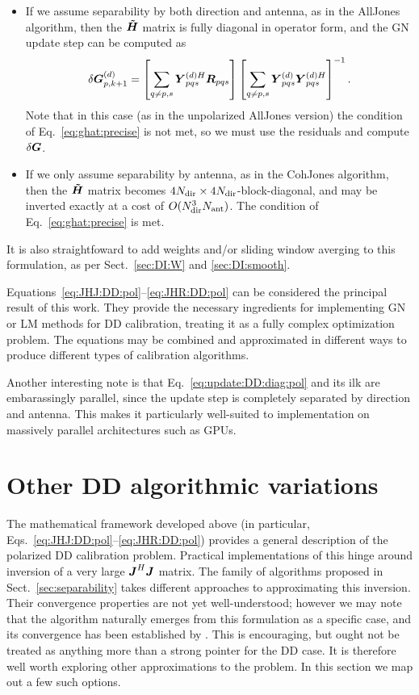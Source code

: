 \documentclass[useAMS,usenatbib]{mn2e}
\newcommand{\mat}[1]{{\bmath{#1}}}
\newcommand{\JJ}{\mat{J}} %
\newcommand{\HHa}{\mat{\tilde{H}}} %
\newcommand{\RR}{\mat{R}}
\newcommand{\GG}{\mat{G}}
\newcommand{\JHJ}{\JJ^H\JJ} %
\newcommand{\StefCal}{{\sc StefCal}}
\numberwithin{equation}{section}
\begin{document}
\begin{itemize} 
\item If we assume separability by both direction and antenna, as in the {\sc AllJones} algorithm, then
the $\HHa$ matrix is fully diagonal in operator form, and the GN update step can be computed as
\begin{equation}
\label{eq:update:DD:diag:pol}
\delta \GGd_{p,k+1} = 
\left [ \sum\limits_{q\ne p,s} \YYdH_{pqs} \RR_{pqs} \right ]
\left [ \sum\limits_{q\ne p,s} \YYd_{pqs} \YYdH_{pqs}  \right ]^{-1}.
\end{equation}
Note that in this case (as in the unpolarized {\sc AllJones} version) the condition of Eq.~\ref{eq:ghat:precise}
is not met, so we must use the residuals and compute $\delta\GG$.

\item If we only assume separability by antenna, as in the {\sc CohJones} algorithm, then the $\HHa$ matrix 
becomes $4N_\mathrm{dir}\times4N_\mathrm{dir}$-block-diagonal, and may be inverted exactly at a cost of $O(N_\mathrm{dir}^3N_\mathrm{ant})$. The condition 
of Eq.~\ref{eq:ghat:precise} is met.
\end{itemize}

It is also straightfoward to add weights and/or sliding window averging to this formulation, as per 
Sect.~\ref{sec:DI:W} and \ref{sec:DI:smooth}.

Equations~\ref{eq:JHJ:DD:pol}--\ref{eq:JHR:DD:pol} can be considered the principal result of this work.
They provide the necessary ingredients for implementing GN or LM methods for DD calibration, treating it as a 
fully complex optimization problem. The equations may be combined and approximated in different 
ways to produce different types of calibration algorithms. 

Another interesting note is that Eq.~\ref{eq:update:DD:diag:pol} and its ilk are embarassingly parallel, since the update step is 
completely separated by direction and antenna. This makes it particularly well-suited to implementation on massively 
parallel architectures such as GPUs.

\section{Other DD algorithmic variations}
\label{sec:variations}

The mathematical framework developed above (in particular, Eqs.~\ref{eq:JHJ:DD:pol}--\ref{eq:JHR:DD:pol}) provides
a general description of the polarized DD calibration problem. Practical implementations of this hinge around inversion of
a very large $\JHJ$ matrix. The family of algorithms proposed in Sect.~\ref{sec:separability} takes different approaches
to approximating this inversion. Their convergence properties are not yet well-understood; however we may note that 
the {\sc \StefCal} algorithm naturally emerges from this formulation as a specific case, and its convergence has been 
established by \citet{Stefcal}. This is encouraging, but ought not be treated as anything more than a strong pointer for 
the DD case. It is therefore well worth exploring other approximations to the problem. In this section we map out a few 
such options.
\end{document}
